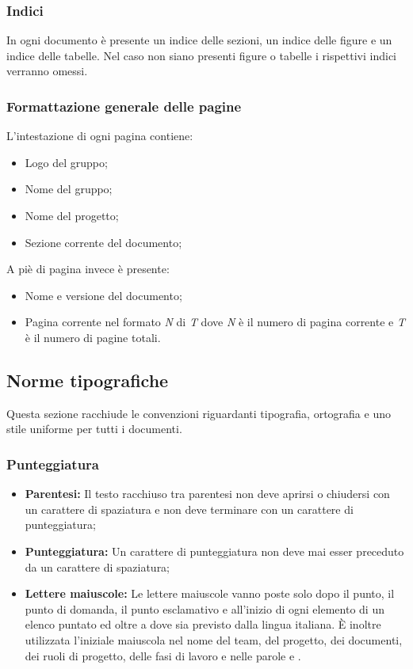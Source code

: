       \subsubsection{Indici}
        In ogni documento è presente un indice delle sezioni, un indice delle figure e un indice delle tabelle. Nel caso non siano presenti figure o tabelle i rispettivi indici verranno omessi.
      \subsubsection{Formattazione generale delle pagine}
        L’intestazione di ogni pagina contiene:
        \begin{itemize}
          \item Logo del gruppo;
          \item Nome del gruppo;
          \item Nome del progetto;
          \item Sezione corrente del documento;
        \end{itemize}
        A piè di pagina invece è presente:
        \begin{itemize}
          \item Nome e versione del documento;
          \item Pagina corrente nel formato \emph{N} di \emph{T} dove \emph{N} è il numero di pagina corrente e \emph{T} è il numero di pagine totali.
        \end{itemize}
    \subsection{Norme tipografiche}
      Questa sezione racchiude le convenzioni riguardanti tipografia, ortografia e uno stile uniforme per tutti i documenti.
      \subsubsection{Punteggiatura}
        \begin{itemize}
          \item \textbf{Parentesi: }Il testo racchiuso tra parentesi non deve aprirsi o chiudersi con un carattere di spaziatura e non deve terminare con un carattere di punteggiatura;
          \item \textbf{Punteggiatura: }Un carattere di punteggiatura non deve mai esser preceduto da un carattere di spaziatura;
          \item \textbf{Lettere maiuscole: }Le lettere maiuscole vanno poste solo dopo il punto, il punto di domanda, il punto esclamativo e all’inizio di ogni elemento di un elenco puntato ed
          oltre a dove sia previsto dalla lingua italiana. È inoltre utilizzata l’iniziale maiuscola nel nome del team, del progetto, dei documenti, dei ruoli di progetto, delle fasi di
          lavoro e nelle parole  e .
        \end{itemize}
